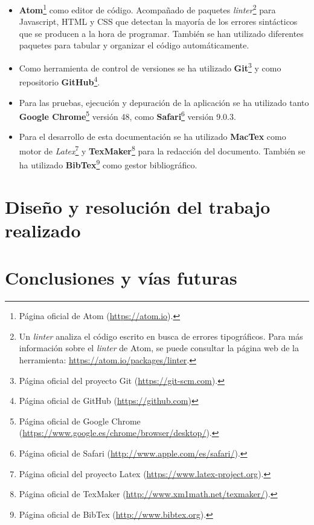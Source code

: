\begin{itemize}
	\item \textbf{Atom}\footnote{Página oficial de Atom (\url{https://atom.io}).} como editor de código. Acompañado de paquetes \emph{linter}\footnote{Un \emph{linter} analiza el código escrito en busca de errores tipográficos. Para más información sobre el \emph{linter} de Atom, se puede consultar la página web de la herramienta: \url{https://atom.io/packages/linter}.} para Javascript, HTML y CSS que detectan la mayoría de los errores sintácticos que se producen a la hora de programar. También se han utilizado diferentes paquetes para tabular y organizar el código automáticamente. 

	\item Como herramienta de control de versiones se ha utilizado \textbf{Git}\footnote{Página oficial del proyecto Git (\url{https://git-scm.com}).} y como repositorio \textbf{GitHub}\footnote{Página oficial de GitHub (\url{https://github.com})}.
	
	\item Para las pruebas, ejecución y depuración de la aplicación se ha utilizado tanto \textbf{Google Chrome}\footnote{Página oficial de Google Chrome (\url{https://www.google.es/chrome/browser/desktop/}).} versión 48, como \textbf{Safari}\footnote{Página oficial de Safari (\url{http://www.apple.com/es/safari/}).} versión 9.0.3.
	
	\item Para el desarrollo de esta documentación se ha utilizado \textbf{MacTex} como motor de \emph{Latex}\footnote{Página oficial del proyecto Latex (\url{https://www.latex-project.org}).} y \textbf{TexMaker}\footnote{Página oficial de TexMaker (\url{http://www.xm1math.net/texmaker/}).} para la redacción del documento. También se ha utilizado \textbf{BibTex}\footnote{Página oficial de BibTex (\url{http://www.bibtex.org}).} como gestor bibliográfico.
\end{itemize}




\chapter{Diseño y resolución del trabajo realizado}
\label{diseno}



 



\chapter{Conclusiones y vías futuras}\label{conslusiones}






